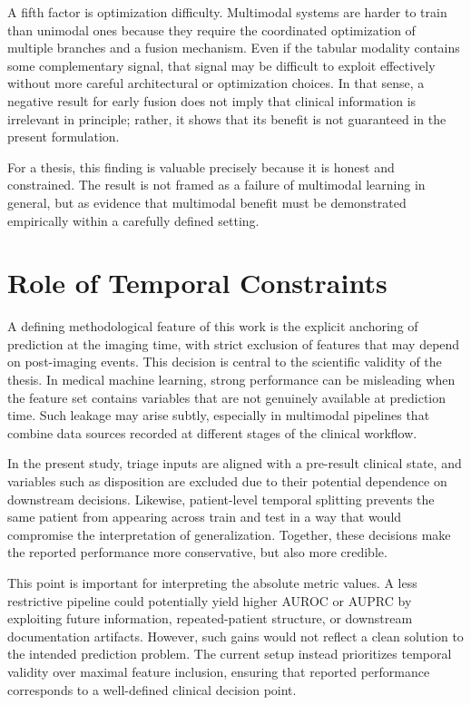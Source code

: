 A fifth factor is optimization difficulty. Multimodal systems are harder to train than unimodal ones because they require the coordinated optimization of multiple branches and a fusion mechanism. Even if the tabular modality contains some complementary signal, that signal may be difficult to exploit effectively without more careful architectural or optimization choices. In that sense, a negative result for early fusion does not imply that clinical information is irrelevant in principle; rather, it shows that its benefit is not guaranteed in the present formulation.

For a thesis, this finding is valuable precisely because it is honest and constrained. The result is not framed as a failure of multimodal learning in general, but as evidence that multimodal benefit must be demonstrated empirically within a carefully defined setting.

\section{Role of Temporal Constraints}

A defining methodological feature of this work is the explicit anchoring of prediction at the imaging time, with strict exclusion of features that may depend on post-imaging events. This decision is central to the scientific validity of the thesis. In medical machine learning, strong performance can be misleading when the feature set contains variables that are not genuinely available at prediction time. Such leakage may arise subtly, especially in multimodal pipelines that combine data sources recorded at different stages of the clinical workflow.

In the present study, triage inputs are aligned with a pre-result clinical state, and variables such as disposition are excluded due to their potential dependence on downstream decisions. Likewise, patient-level temporal splitting prevents the same patient from appearing across train and test in a way that would compromise the interpretation of generalization. Together, these decisions make the reported performance more conservative, but also more credible.

This point is important for interpreting the absolute metric values. A less restrictive pipeline could potentially yield higher AUROC or AUPRC by exploiting future information, repeated-patient structure, or downstream documentation artifacts. However, such gains would not reflect a clean solution to the intended prediction problem. The current setup instead prioritizes temporal validity over maximal feature inclusion, ensuring that reported performance corresponds to a well-defined clinical decision point.

